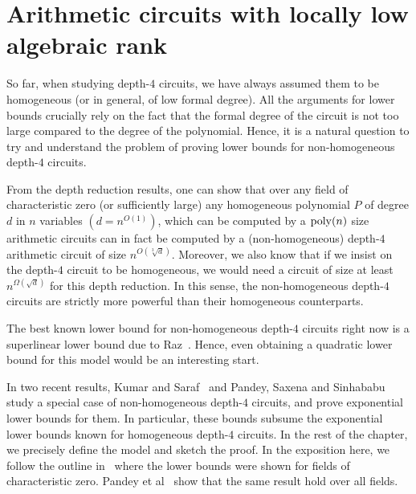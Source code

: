 \chapter{Arithmetic circuits with locally low algebraic rank}
\label{chap:lowAlgRank}

\newcommand{\spnew}{\Sigma{\Pi^{(k)}}\Sigma\Pi}
\newcommand{\spnewn}{\Sigma{\Pi^{(n)}}\Sigma\Pi}
\newcommand{\spnewbounded}{\Sigma{\Pi^{(k)}}\Sigma\Pi^{[d]}}
\newcommand{\spgeneral}{\Sigma{\Gamma^{(k)}}\Sigma\Pi}
\def\h{\mathsf{Hom}}


So far, when studying depth-$4$ circuits, we have always assumed them to be homogeneous (or in general, of low formal degree). All the arguments for lower bounds crucially rely on the fact that the formal degree of the circuit is not too large compared to the degree of the polynomial. Hence, it is a natural question to try and understand the problem of proving lower bounds for non-homogeneous depth-$4$ circuits. 

From the depth reduction results, one can show that over any field of characteristic zero (or sufficiently large) any homogeneous polynomial $P$ of degree $d$ in $n$ variables $(d = n^{O(1)})$, which can be computed by a $\operatorname{poly}(n)$ size arithmetic circuits can in fact be computed by a (non-homogeneous) depth-$4$ arithmetic circuit of size $n^{O(\sqrt[3]{d})}$. Moreover,  we also know that if we insist on the depth-$4$ circuit to be homogeneous, we would need a circuit of size at least $n^{\Omega(\sqrt{d})}$ for this depth reduction. In this sense, the non-homogeneous depth-$4$ circuits are strictly more powerful than their homogeneous counterparts. 

The best known lower bound for non-homogeneous depth-$4$ circuits right now is a superlinear lower bound due to Raz~\cite{Raz10elusive}. Hence, even obtaining a quadratic lower bound for this model would be an interesting start. 

In two recent results, Kumar and Saraf~\cite{KS16lowrank} and Pandey, Saxena and Sinhababu~\cite{PSS16} study a special case of non-homogeneous depth-$4$ circuits, and prove exponential lower bounds for them. In particular, these bounds subsume the exponential lower bounds known for homogeneous depth-$4$ circuits. In the rest of the chapter, we precisely define the model and sketch the proof. In the exposition here, we follow the outline in~\cite{KS16lowrank} where the lower bounds were shown for fields of characteristic zero. Pandey et al~\cite{PSS16} show that the same result hold over all fields. 


